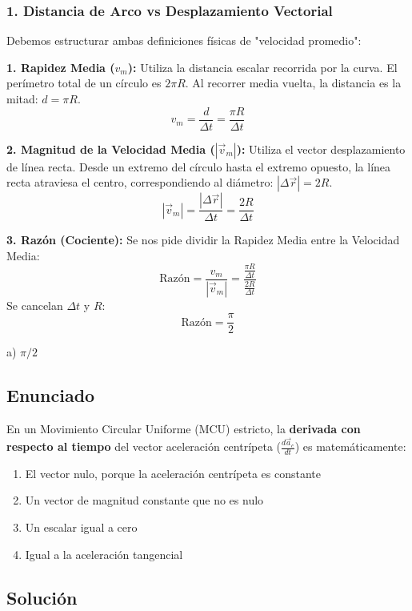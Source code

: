 \documentclass[12pt, a4paper]{article}
\begin{document}
\subsubsection*{1. Distancia de Arco vs Desplazamiento Vectorial}
Debemos estructurar ambas definiciones físicas de "velocidad promedio":

\textbf{1. Rapidez Media ($v_m$):}
Utiliza la distancia escalar recorrida por la curva. El perímetro total de un círculo es $2\pi R$. Al recorrer media vuelta, la distancia es la mitad: $d = \pi R$.
$$ v_m = \frac{d}{\Delta t} = \frac{\pi R}{\Delta t} $$

\textbf{2. Magnitud de la Velocidad Media ($|\vec{v}_m|$):}
Utiliza el vector desplazamiento de línea recta. Desde un extremo del círculo hasta el extremo opuesto, la línea recta atraviesa el centro, correspondiendo al diámetro: $|\Delta \vec{r}| = 2R$.
$$ |\vec{v}_m| = \frac{|\Delta \vec{r}|}{\Delta t} = \frac{2R}{\Delta t} $$

\textbf{3. Razón (Cociente):}
Se nos pide dividir la Rapidez Media entre la Velocidad Media:
$$ \text{Razón} = \frac{v_m}{|\vec{v}_m|} = \frac{ \frac{\pi R}{\Delta t} }{ \frac{2R}{\Delta t} } $$
Se cancelan $\Delta t$ y $R$:
$$ \text{Razón} = \frac{\pi}{2} $$

\begin{tcolorbox}[colback=green!5!white, colframe=green!50!black, title=Respuesta Final]
\centering \Large a) $\pi / 2$
\end{tcolorbox}

\newpage

\subsection*{Enunciado}
En un Movimiento Circular Uniforme (MCU) estricto, la \textbf{derivada con respecto al tiempo} del vector aceleración centrípeta ($\frac{d\vec{a}_c}{dt}$) es matemáticamente:
\begin{enumerate}[label=\alph*)]
    \item El vector nulo, porque la aceleración centrípeta es constante
    \item Un vector de magnitud constante que no es nulo
    \item Un escalar igual a cero
    \item Igual a la aceleración tangencial
\end{enumerate}

\subsection*{Solución}
\end{document}
